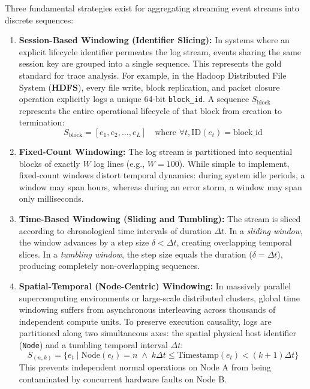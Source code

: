 Three fundamental strategies exist for aggregating streaming event streams into discrete sequences:
\begin{enumerate}
    \item \textbf{Session-Based Windowing (Identifier Slicing):} In systems where an explicit lifecycle identifier permeates the log stream, events sharing the same session key are grouped into a single sequence. This represents the gold standard for trace analysis. For example, in the Hadoop Distributed File System (\textbf{HDFS}), every file write, block replication, and packet closure operation explicitly logs a unique 64-bit \texttt{block\_id}. A sequence $S_{\text{block}}$ represents the entire operational lifecycle of that block from creation to termination:
    \begin{equation}
        S_{\text{block}} = [e_1, e_2, \dots, e_L] \quad \text{where } \forall t, \text{ID}(e_t) = \text{block\_id}
    \end{equation}
    \item \textbf{Fixed-Count Windowing:} The log stream is partitioned into sequential blocks of exactly $W$ log lines (e.g., $W=100$). While simple to implement, fixed-count windows distort temporal dynamics: during system idle periods, a window may span hours, whereas during an error storm, a window may span only milliseconds.
    \item \textbf{Time-Based Windowing (Sliding and Tumbling):} The stream is sliced according to chronological time intervals of duration $\Delta t$. In a \textit{sliding window}, the window advances by a step size $\delta < \Delta t$, creating overlapping temporal slices. In a \textit{tumbling window}, the step size equals the duration ($\delta = \Delta t$), producing completely non-overlapping sequences.
    \item \textbf{Spatial-Temporal (Node-Centric) Windowing:} In massively parallel supercomputing environments or large-scale distributed clusters, global time windowing suffers from asynchronous interleaving across thousands of independent compute units. To preserve execution causality, logs are partitioned along two simultaneous axes: the spatial physical host identifier (\texttt{Node}) and a tumbling temporal interval $\Delta t$:
    \begin{equation}
        S_{(n, k)} = \{ e_t \mid \text{Node}(e_t) = n \;\land\; k\Delta t \le \text{Timestamp}(e_t) < (k+1)\Delta t \}
    \end{equation}
    This prevents independent normal operations on Node A from being contaminated by concurrent hardware faults on Node B.
\end{enumerate}

